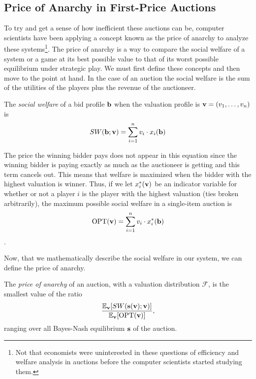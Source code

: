 \documentclass[12pt,twoside]{reedthesis}
\begin{document}
\subsection{Price of Anarchy in First-Price Auctions}  
To try and get a sense of how inefficient these auctions can be, computer scientists have been applying a concept known as the price of anarchy to analyze these systems\footnote{Not that economists were uninterested in these questions of efficiency and welfare analysis in auctions before the computer scientists started studying them.}. The price of anarchy is a way to compare the social welfare of a system or a game at its best possible value to that of its worst possible equilibrium under strategic play. We must first define these concepts and then move to the point at hand. In the case of an auction the social welfare is the sum of the utilities of the players plus the revenue of the auctioneer.

\begin{dfn}
	The \textit{social welfare} of a bid profile $\textbf{b}$ when the valuation profile is $\textbf{v} = (v_1, \ldots, v_n)$ is 
	$$ SW(\textbf{b};\textbf{v}) = \sum_{i=1}^{n} v_i \cdot x_i (\textbf{b})$$
\end{dfn}

The price the winning bidder pays does not appear in this equation since the winning bidder is paying exactly as much as the auctioneer is getting and this term cancels out. This means that welfare is maximized when the bidder with the highest valuation is winner. Thus, if we let $x^*_i(\textbf{v})$ be an indicator variable for whether or not a player $i$ is the player with the highest valuation (ties broken arbitrarily), the maximum possible social welfare in a single-item auction is 
$$ \text{OPT}(\textbf{v}) = \sum_{i=1}^{n} v_i \cdot x^*_i (\textbf{b})$$.

Now, that we mathematically describe the social welfare in our system, we can define the price of anarchy. 

\begin{dfn}
	The \textit{price of anarchy} of an auction, with a valuation distribution $\mathcal{F}$, is the smallest value of the ratio
	$$ \frac{\mathbb{E}_{\textbf{v}} [SW(\textbf{s}(\textbf{v});\textbf{v})]}{\mathbb{E}_{\textbf{v}}[\text{OPT}(\textbf{v})]},$$
	ranging over all Bayes-Nash equilibrium $\textbf{s}$ of the auction.
\end{dfn}
\end{document}
